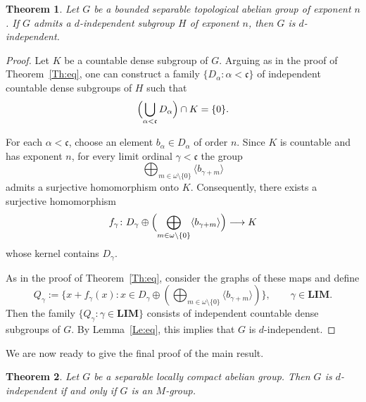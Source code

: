 \documentclass[12pt]{amsart}
\newtheorem{theorem}{Theorem}[section]
\theoremstyle{definition}
\theoremstyle{remark}
\begin{document}
\begin{theorem}\label{bounded}
Let $G$ be a bounded separable topological abelian group of exponent $n$.
If $G$ admits a $d$-independent subgroup $H$ of exponent $n$, then $G$ is
$d$-independent.
\end{theorem}

\begin{proof}
Let $K$ be a countable dense subgroup of $G$.
Arguing as in the proof of Theorem~\ref{Th:eq}, one can construct a family
$\{D_\alpha:\alpha<\mathfrak{c}\}$ of independent countable dense
subgroups of $H$ such that
\[
\Bigl(\bigcup_{\alpha<\mathfrak{c}}D_\alpha\Bigr)\cap K=\{0\}.
\]

For each $\alpha<\mathfrak{c}$, choose an element $b_\alpha\in D_\alpha$ of
order $n$.
Since $K$ is countable and has exponent $n$, for every limit ordinal
$\gamma<\mathfrak{c}$ the group
\[
\bigoplus_{m\in\omega\setminus\{0\}}\langle b_{\gamma+m}\rangle
\]
admits a surjective homomorphism onto $K$.
Consequently, there exists a surjective homomorphism
\[
f_\gamma\colon
D_\gamma\oplus\Bigl(\bigoplus_{m\in\omega\setminus\{0\}}
\langle b_{\gamma+m}\rangle\Bigr)\longrightarrow K
\]
whose kernel contains $D_\gamma$.

As in the proof of Theorem~\ref{Th:eq}, consider the graphs of these maps and
define
\[
Q_\gamma:=\{x+f_\gamma(x):
x\in D_\gamma\oplus(\bigoplus_{m\in\omega\setminus\{0\}}
\langle b_{\gamma+m}\rangle)\},
\qquad \gamma\in\mathbf{LIM}.
\]
Then the family $\{Q_\gamma:\gamma\in\mathbf{LIM}\}$ consists of independent
countable dense subgroups of $G$.
By Lemma~\ref{Le:eq}, this implies that $G$ is $d$-independent.
\end{proof}



We are now ready to give the final proof of the main result.



\begin{theorem}
Let $G$ be a separable locally compact abelian group.
Then $G$ is $d$-independent if and only if $G$ is an $M$-group.
\end{theorem}
\end{document}
